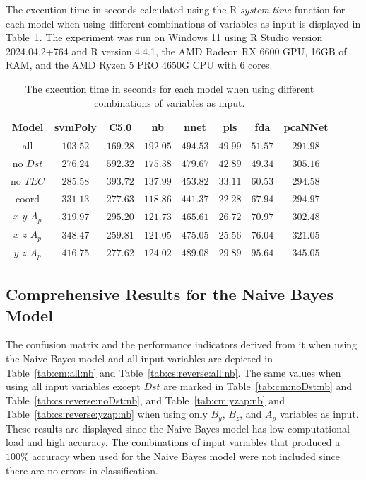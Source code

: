 \documentclass[sn-mathphys-num]{sn-jnl}%
\begin{document}
The execution time in seconds calculated using the R \textit{system.time} function \cite{system.time2024} for each model when using different combinations of variables as input is displayed in Table~\ref{tab:time:total}. The experiment was run on Windows 11 using R Studio version 2024.04.2+764 and R version 4.4.1, the AMD Radeon RX 6600 GPU, 16GB of RAM, and the AMD Ryzen 5 PRO 4650G CPU with 6 cores.

\begin{table}[!ht]
    \centering
    \caption{The execution time in seconds for each model when using different combinations of variables as input.}
	\label{tab:time:total}
	\begin{tabular}{|c|c|c|c|c|c|c|c|}
		\hline
		Model & svmPoly & C5.0 & nb & nnet & pls & fda & pcaNNet \\ \hline
		all & $103.52$ & $169.28$ & $192.05$ & $494.53$ & $49.99$ & $51.57$ & $291.98$ \\ \hline
		no $Dst$ & $276.24$ & $592.32$ & $175.38$ & $479.67$ & $42.89$ & $49.34$ & $305.16$ \\ \hline
		no $TEC$ & $285.58$ & $393.72$ & $137.99$ & $453.82$ & $33.11$ & $60.53$ & $294.58$ \\ \hline
		coord & $331.13$ & $277.63$ & $118.86$ & $441.37$ & $22.28$ & $67.94$ & $294.97$ \\ \hline
		$x$ $y$ $A_{p}$ & $319.97$ & $295.20$ & $121.73$ & $465.61$ & $26.72$ & $70.97$ & $302.48$ \\ \hline
		$x$ $z$ $A_{p}$ & $348.47$ & $259.81$ & $121.05$ & $475.05$ & $25.56$ & $76.04$ & $321.05$ \\ \hline
		$y$ $z$ $A_{p}$ & $416.75$ & $277.62$ & $124.02$ & $489.08$ & $29.89$ & $95.64$ & $345.05$ \\ \hline
	\end{tabular}
\end{table}

\subsection{Comprehensive Results for the Naive Bayes Model}

The confusion matrix and the performance indicators derived from it when using the Naive Bayes model and all input variables are depicted in Table~\ref{tab:cm:all:nb} and Table~\ref{tab:cs:reverse:all:nb}. The same values when using all input variables except $Dst$ are marked in Table~\ref{tab:cm:noDst:nb} and Table~\ref{tab:cs:reverse:noDst:nb}, and Table~\ref{tab:cm:yzap:nb} and Table~\ref{tab:cs:reverse:yzap:nb} when using only $B_{y}$, $B_{z}$, and $A_{p}$ variables as input. These results are displayed since the Naive Bayes model has low computational load and high accuracy. The combinations of input variables that produced a $100\%$ accuracy when used for the Naive Bayes model were not included since there are no errors in classification.
\end{document}

